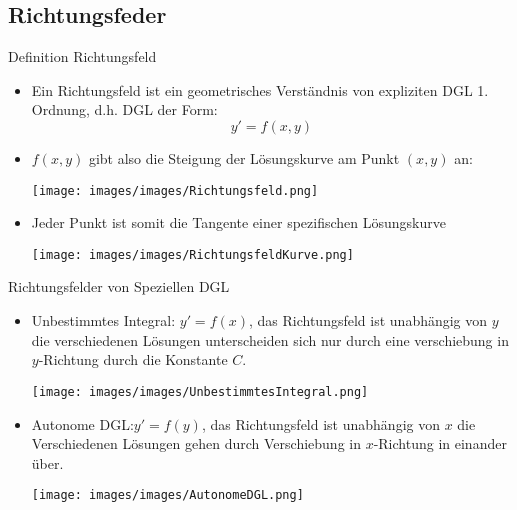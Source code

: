 \subsection{Richtungsfeder}
\begin{definition}{Definition Richtungsfeld}\\
  \begin{itemize}
    \item Ein Richtungsfeld ist ein geometrisches Verständnis von expliziten DGL 1. Ordnung, d.h. DGL der Form:
      \[y'=f(x,y)\]
    \item \(f(x,y)\) gibt also die Steigung der Lösungskurve am Punkt \((x,y)\) an:
  \begin{center}
  \texttt{[image: images/images/Richtungsfeld.png]}
  \end{center}
    \item Jeder Punkt ist somit die Tangente einer spezifischen Lösungskurve
  \begin{center}
  \texttt{[image: images/images/RichtungsfeldKurve.png]}
  \end{center}
  \end{itemize}
\end{definition}
\begin{definition}{Richtungsfelder von Speziellen DGL}\\
  \begin{itemize}
    \item Unbestimmtes Integral: \(y'=f(x)\), das Richtungsfeld ist unabhängig von \(y\) die verschiedenen Lösungen
      unterscheiden sich nur durch eine verschiebung in \(y\)-Richtung durch die Konstante \(C\).
  \begin{center}
  \texttt{[image: images/images/UnbestimmtesIntegral.png]}
  \end{center}
\item Autonome DGL:\(y'=f(y)\), das Richtungsfeld ist unabhängig von \(x\) die Verschiedenen Lösungen gehen durch
  Verschiebung in \(x\)-Richtung in einander über.
  \begin{center}
  \texttt{[image: images/images/AutonomeDGL.png]}
  \end{center}
  \end{itemize}
\end{definition}
